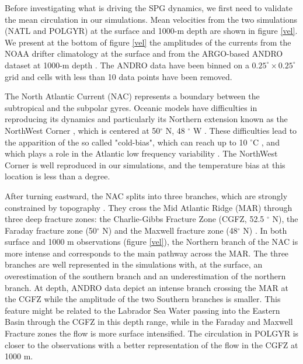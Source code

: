 \documentclass{ametsoc}
\begin{document}
Before investigating what is driving the SPG dynamics, we first need to validate the mean circulation in our simulations. Mean velocities from the two simulations (NATL and POLGYR) at the surface and 1000-m depth are shown in figure \ref{vel}. We present at the bottom of figure \ref{vel} the amplitudes of the currents from the NOAA drifter climatology \citep{laurindo2017} at the surface and from the ARGO-based ANDRO dataset at 1000-m depth \citep{ollitrault2013,lebedev2007}. The ANDRO data have been binned on a $0.25^{\circ}\times 0.25^{\circ}$ grid and cells with less than 10 data points have been removed. 

The North Atlantic Current (NAC) represents a boundary between the subtropical and the subpolar gyres. Oceanic models have difficulties in reproducing its dynamics and particularly its Northern extension known as the NorthWest Corner \citep{bryan2007,hecht2008,drews2015}, which is centered at 50$^{\circ}$ N, 48 $^{\circ}$ W \citep{lazier1994}. These difficulties lead to the apparition of the so called "cold-bias", which can reach up to 10 $^{\circ}$C \citep{griffies2009,talandier2014, drews2015}, and which plays a role in the Atlantic low frequency variability \citep{drews2017}. The NorthWest Corner is well reproduced in our simulations, and the temperature bias at this location is less than a degree.  


After turning eastward, the NAC splits into three branches, which are strongly constrained by topography \citep{bower2008}. They cross the Mid Atlantic Ridge (MAR) through three deep fracture zones: the Charlie-Gibbs Fracture Zone (CGFZ, 52.5 $^{\circ}$ N), the Faraday fracture zone (50$^{\circ}$ N) and the Maxwell fracture zone (48$^{\circ}$ N) \citep{bower2002}. In both surface and 1000 m observations (figure \ref{vel}), the Northern branch of the NAC is more intense and corresponds to the main pathway across the MAR. The three branches are well represented in the simulations with, at the surface, an overestimation of the southern branch and an underestimation of the northern branch. At depth, ANDRO data depict an intense branch crossing the MAR at the CGFZ while the amplitude of the two Southern branches is smaller. This feature might be related to the Labrador Sea Water passing into the Eastern Basin through the CGFZ in this depth range, while in the Faraday and Maxwell Fracture zones the flow is more surface intensified. The circulation in POLGYR is closer to the observations with a better representation of the flow in the CGFZ at 1000 m. 
\end{document}
